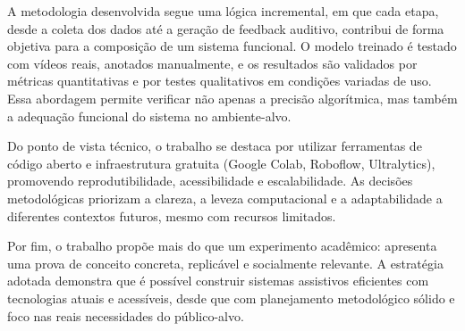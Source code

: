 A metodologia desenvolvida segue uma lógica incremental, em que cada etapa, desde a coleta dos dados até a geração de feedback auditivo, contribui de forma objetiva para a composição de um sistema funcional. O modelo treinado é testado com vídeos reais, anotados manualmente, e os resultados são validados por métricas quantitativas e por testes qualitativos em condições variadas de uso. Essa abordagem permite verificar não apenas a precisão algorítmica, mas também a adequação funcional do sistema no ambiente-alvo.

Do ponto de vista técnico, o trabalho se destaca por utilizar ferramentas de código aberto e infraestrutura gratuita (Google Colab, Roboflow, Ultralytics), promovendo reprodutibilidade, acessibilidade e escalabilidade. As decisões metodológicas priorizam a clareza, a leveza computacional e a adaptabilidade a diferentes contextos futuros, mesmo com recursos limitados.

Por fim, o trabalho propõe mais do que um experimento acadêmico: apresenta uma prova de conceito concreta, replicável e socialmente relevante. A estratégia adotada demonstra que é possível construir sistemas assistivos eficientes com tecnologias atuais e acessíveis, desde que com planejamento metodológico sólido e foco nas reais necessidades do público-alvo.